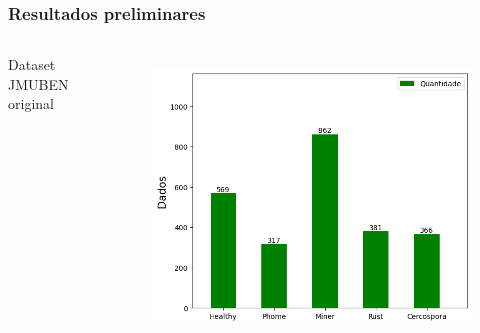 \documentclass[aspectratio=169]{beamer}
\begin{document}





\begin{frame}
    \frametitle{Resultados preliminares}

    \centering


    \begin{columns}



        \centering
        Dataset JMUBEN original
        \begin{figure}
            \centering
            \includegraphics[scale=0.39]{img/jmubennormal.png}
            \label{fig:enter-label}
        \end{figure}
        \centering




\end{columns}
\end{frame}
\end{document}
